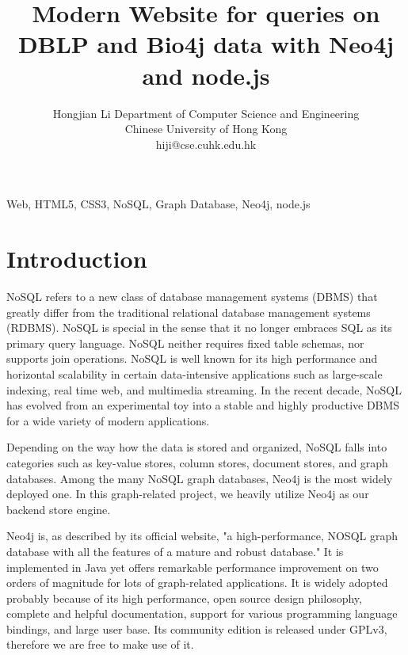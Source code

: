 \documentclass[10pt, conference, compsocconf]{IEEEtran}
\begin{document}
\title{Modern Website for queries on DBLP and Bio4j data with Neo4j and node.js} %
\author
{
\IEEEauthorblockN
{
Hongjian Li
\IEEEauthorblockA
{
Department of Computer Science and Engineering\\
Chinese University of Hong Kong\\
hiji@cse.cuhk.edu.hk
}
}
}
\maketitle

\begin{abstract}



\end{abstract}

\begin{IEEEkeywords}

Web, HTML5, CSS3, NoSQL, Graph Database, Neo4j, node.js

\end{IEEEkeywords}

\section{Introduction}

NoSQL refers to a new class of database management systems (DBMS) that greatly differ from the traditional relational database management systems (RDBMS). NoSQL is special in the sense that it no longer embraces SQL as its primary query language. NoSQL neither requires fixed table schemas, nor supports join operations. NoSQL is well known for its high performance and horizontal scalability in certain data-intensive applications such as large-scale indexing, real time web, and multimedia streaming. In the recent decade, NoSQL has evolved from an experimental toy into a stable and highly productive DBMS for a wide variety of modern applications.

Depending on the way how the data is stored and organized, NoSQL falls into categories such as key-value stores, column stores, document stores, and graph databases. Among the many NoSQL graph databases, Neo4j \citep{eifrem2009neo4j} is the most widely deployed one. In this graph-related project, we heavily utilize Neo4j as our backend store engine.

Neo4j is, as described by its official website, "a high-performance, NOSQL graph database with all the features of a mature and robust database." It is implemented in Java yet offers remarkable performance improvement on two orders of magnitude for lots of graph-related applications. It is widely adopted probably because of its high performance, open source design philosophy, complete and helpful documentation, support for various programming language bindings, and large user base. Its community edition is released under GPLv3, therefore we are free to make use of it.
\end{document}
